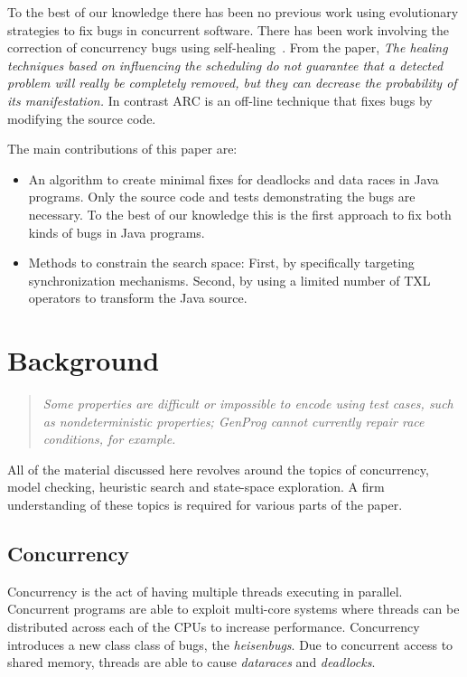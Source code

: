 \documentclass[10pt, conference, compsocconf]{IEEEtran}
\begin{document}
To the best of our knowledge there has been no previous work using evolutionary
strategies to fix bugs in concurrent software.  There has been work involving
the correction of concurrency bugs using self-healing~\cite{LVK08}. From the
paper, \textit{The healing techniques based on influencing the scheduling do
not guarantee that a detected problem will really be completely removed, but
they can decrease the probability of its manifestation.} In contrast ARC is an
off-line technique that fixes bugs by modifying the source code.

The main contributions of this paper are:

\begin{itemize}

\item An algorithm to create minimal fixes for deadlocks and data races in Java
programs. Only the source code and tests demonstrating the bugs are necessary.
To the best of our knowledge this is the first approach to fix both kinds of
bugs in Java programs.

\item Methods to constrain the search space: First, by specifically targeting
synchronization mechanisms. Second, by using a limited number of TXL operators
to transform the Java source.

\end{itemize}

\section{Background}
\label{sec:background}

\begin{quote}\textit{Some properties are difficult or impossible to encode
using test cases, such as nondeterministic properties; GenProg cannot
currently repair race conditions, for example.}~\cite{GNFW11}
\end{quote}

All of the material discussed here revolves around the topics of concurrency,
model checking, heuristic search and state-space exploration. A firm
understanding of these topics is required for various parts of the paper.

\subsection{Concurrency}
\label{sec:concurrency}

Concurrency is the act of having multiple threads executing in parallel.
Concurrent programs are able to exploit multi-core systems where threads can
be distributed across each of the CPUs to increase performance. Concurrency
introduces a new class class of bugs, the \textit{heisenbugs}.  Due to 
concurrent access to shared memory, threads are able to cause 
\textit{dataraces} and \textit{deadlocks}.
\end{document}
